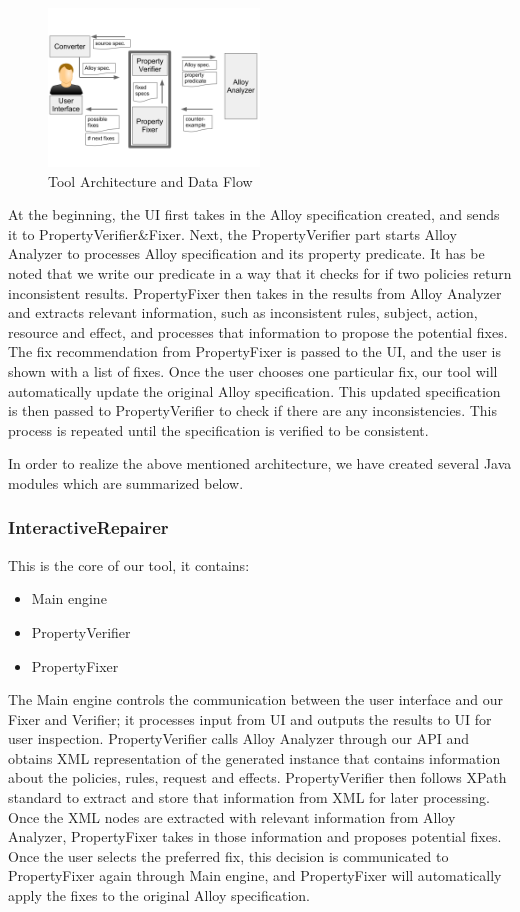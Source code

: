 \documentclass{acm_proc_article-sp}
\begin{document}
\begin{figure}[h]
\includegraphics[width=0.5\textwidth]{dataflow.png}
\caption{Tool Architecture and Data Flow}    
  \label{fig:Architecture}
\end{figure}

At the beginning, the UI first takes in the Alloy specification created, and sends it to PropertyVerifier\&Fixer. Next, the PropertyVerifier part starts Alloy Analyzer to processes Alloy specification and its property predicate. It has be noted that we write our predicate in a way that it checks for if two policies return inconsistent results. PropertyFixer then takes in the results from Alloy Analyzer and extracts relevant information, such as inconsistent rules, subject, action, resource and effect, and processes that information to propose the potential fixes. The fix recommendation from PropertyFixer is passed to the UI, and the user is shown with a list of fixes. Once the user chooses one particular fix, our tool will automatically update the original Alloy specification. This updated specification is then passed to PropertyVerifier to check if there are any inconsistencies. This process is repeated until the specification is verified to be consistent.

In order to realize the above mentioned architecture, we have created several Java modules which are summarized below.

\subsubsection{InteractiveRepairer}
This is the core of our tool, it contains:
\begin{itemize}
\item Main engine
\item PropertyVerifier
\item PropertyFixer
\end{itemize}
The Main engine controls the communication between the user interface and our Fixer and Verifier; it processes input from UI and outputs the results to UI for user inspection. PropertyVerifier calls Alloy Analyzer through our API and obtains XML representation of the generated instance that contains information about the policies, rules, request and effects. PropertyVerifier then follows XPath standard to extract and store that information from XML for later processing. Once the XML nodes are extracted with relevant information from Alloy Analyzer, PropertyFixer takes in those information and proposes potential fixes. Once the user selects the preferred fix, this decision is communicated to PropertyFixer again through Main engine, and PropertyFixer will automatically apply the fixes to the original Alloy specification.
\end{document}
